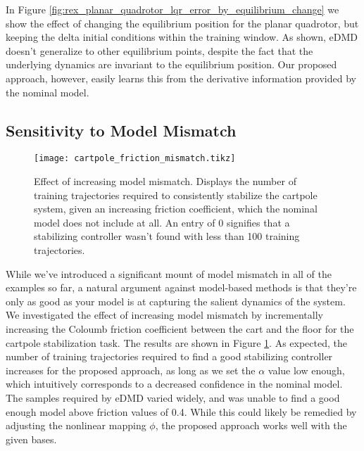 \documentclass{article}
\begin{document}
In Figure \ref{fig:rex_planar_quadrotor_lqr_error_by_equilibrium_change} we show the effect 
of changing the equilibrium position for the planar quadrotor, but keeping the delta initial
conditions within the training window. As shown, eDMD doesn't generalize to other
equilibrium points, despite the fact that the underlying dynamics are invariant to the
equilibrium position. Our proposed approach, however, easily learns this from the derivative
information provided by the nominal model.

\subsection{Sensitivity to Model Mismatch}
\begin{figure}
  \centering
  \texttt{[image: cartpole\_friction\_mismatch.tikz]}
  \caption{Effect of increasing model mismatch. Displays the number of training trajectories
  required to consistently stabilize the cartpole system, given an increasing friction 
  coefficient, which the nominal model does not include at all. An entry of 0 signifies 
  that a stabilizing controller wasn't found with less than 100 training trajectories.
  }
  \label{fig:cartpole_friction_mismatch}
\end{figure}

While we've introduced a significant mount of model mismatch in all of the examples so far, 
a natural argument against model-based methods is that they're only as good as your model is
at capturing the salient dynamics of the system. We investigated the effect of increasing
model mismatch by incrementally increasing the Coloumb friction coefficient between the cart
and the floor for the cartpole stabilization task. The results are shown in Figure 
\ref{fig:cartpole_friction_mismatch}. As expected, the number of training trajectories 
required to find a good stabilizing controller increases for the proposed approach, as long 
as we set the $\alpha$ value low enough, which intuitively corresponds to a decreased 
confidence in the nominal model. The samples required by eDMD varied widely, and was unable 
to find a good enough model above friction values of 0.4. While this could likely be
remedied by adjusting the nonlinear mapping $\phi$, the proposed approach works well with
the given bases.

\end{document}
